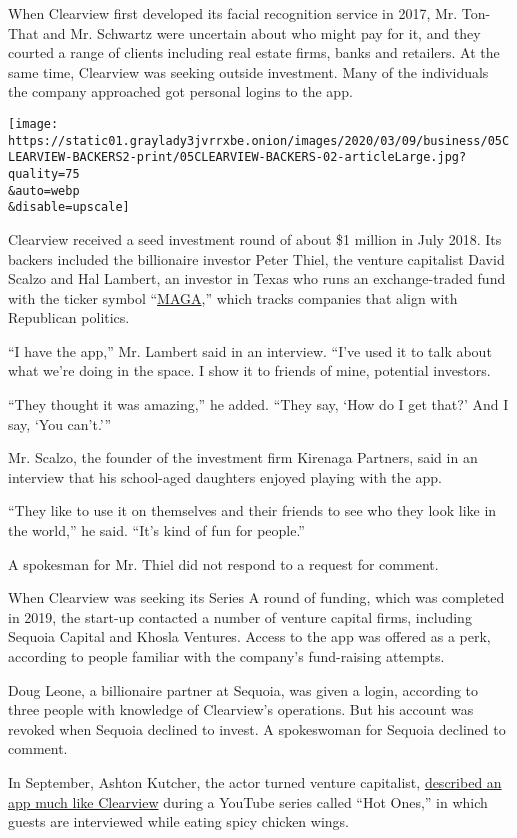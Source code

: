 When Clearview first developed its facial recognition service in 2017,
Mr. Ton-That and Mr. Schwartz were uncertain about who might pay for it,
and they courted a range of clients including real estate firms, banks
and retailers. At the same time, Clearview was seeking outside
investment. Many of the individuals the company approached got personal
logins to the app.

\texttt{[image: https://static01.graylady3jvrrxbe.onion/images/2020/03/09/business/05CLEARVIEW-BACKERS2-print/05CLEARVIEW-BACKERS-02-articleLarge.jpg?quality=75\\\&auto=webp\\\&disable=upscale]}

Clearview received a seed investment round of about \$1 million in July
2018. Its backers included the billionaire investor Peter Thiel, the
venture capitalist David Scalzo and Hal Lambert, an investor in Texas
who runs an exchange-traded fund with the ticker symbol
``\href{https://www.pointbridgecapital.com/etf/}{MAGA},'' which tracks
companies that align with Republican politics.

``I have the app,'' Mr. Lambert said in an interview. ``I've used it to
talk about what we're doing in the space. I show it to friends of mine,
potential investors.

``They thought it was amazing,'' he added. ``They say, `How do I get
that?' And I say, `You can't.'''

Mr. Scalzo, the founder of the investment firm Kirenaga Partners, said
in an interview that his school-aged daughters enjoyed playing with the
app.

``They like to use it on themselves and their friends to see who they
look like in the world,'' he said. ``It's kind of fun for people.''

A spokesman for Mr. Thiel did not respond to a request for comment.

When Clearview was seeking its Series A round of funding, which was
completed in 2019, the start-up contacted a number of venture capital
firms, including Sequoia Capital and Khosla Ventures. Access to the app
was offered as a perk, according to people familiar with the company's
fund-raising attempts.

Doug Leone, a billionaire partner at Sequoia, was given a login,
according to three people with knowledge of Clearview's operations. But
his account was revoked when Sequoia declined to invest. A spokeswoman
for Sequoia declined to comment.

In September, Ashton Kutcher, the actor turned venture capitalist,
\href{https://www.youtube.com/watch?v=nNhYqLbsAGk\&feature=youtu.be\&t=872}{described
an app much like Clearview} during a YouTube series called ``Hot Ones,''
in which guests are interviewed while eating spicy chicken wings.

